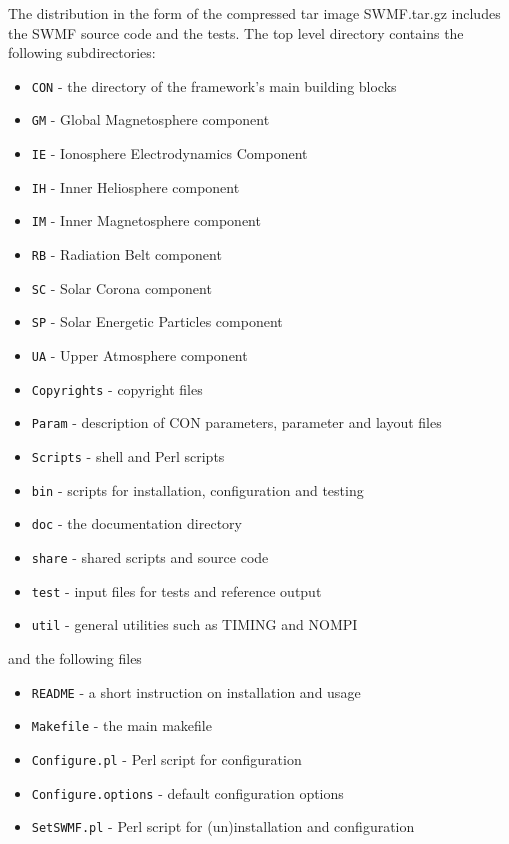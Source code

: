 The distribution in the form of the compressed tar image
SWMF.tar.gz includes the SWMF source code and the tests.
The top level directory contains the following subdirectories:
\begin{itemize}
\item {\tt CON}     - the directory of the framework's main building blocks
\item {\tt GM}      - Global Magnetosphere component       %
\item {\tt IE}      - Ionosphere Electrodynamics Component %
\item {\tt IH}      - Inner Heliosphere component          %
\item {\tt IM}      - Inner Magnetosphere component        %
\item {\tt RB}      - Radiation Belt component             %
\item {\tt SC}      - Solar Corona component               %
\item {\tt SP}      - Solar Energetic Particles component  %
\item {\tt UA}      - Upper Atmosphere component           %
\item {\tt Copyrights} - copyright files
\item {\tt Param}   - description of CON parameters, parameter and layout files
\item {\tt Scripts} - shell and Perl scripts
\item {\tt bin}     - scripts for installation, configuration and testing
\item {\tt doc}     - the documentation directory %
\item {\tt share}   - shared scripts and source code
\item {\tt test}    - input files for tests and reference output
\item {\tt util}    - general utilities such as TIMING and NOMPI
\end{itemize}
and the following files
\begin{itemize}
\item {\tt README}           - a short instruction on installation and usage
\item {\tt Makefile}         - the main makefile
\item {\tt Configure.pl}     - Perl script for configuration %
\item {\tt Configure.options} - default configuration options %
\item {\tt SetSWMF.pl}     - Perl script for (un)installation and configuration
\end{itemize}

